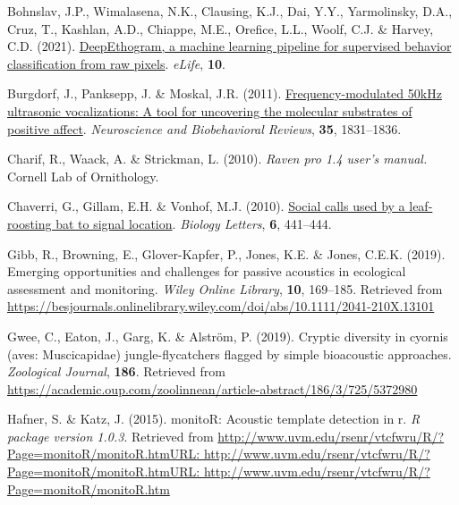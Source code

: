 \documentclass[
]{article}
\newlength{\cslhangindent}
\newlength{\cslentryspacingunit} %
\newenvironment{CSLReferences}[2] %
 {%
  \setlength{\parindent}{0pt}
  \ifodd #1
  \let\oldpar\par
  \def\par{\hangindent=\cslhangindent\oldpar}
  \fi
  \setlength{\parskip}{#2\cslentryspacingunit}
 }%
 {}
\begin{document}
\begin{CSLReferences}{1}{0}
\leavevmode{}%
Bohnslav, J.P., Wimalasena, N.K., Clausing, K.J., Dai, Y.Y.,
Yarmolinsky, D.A., Cruz, T., Kashlan, A.D., Chiappe, M.E., Orefice,
L.L., Woolf, C.J. \& Harvey, C.D. (2021).
\href{https://doi.org/10.7554/ELIFE.63377}{DeepEthogram, a machine
learning pipeline for supervised behavior classification from raw
pixels}. \emph{eLife}, \textbf{10}.

\leavevmode{}%
Burgdorf, J., Panksepp, J. \& Moskal, J.R. (2011).
\href{https://doi.org/10.1016/j.neubiorev.2010.11.011}{Frequency-modulated
50kHz ultrasonic vocalizations: A tool for uncovering the molecular
substrates of positive affect}. \emph{Neuroscience and Biobehavioral
Reviews}, \textbf{35}, 1831--1836.

\leavevmode{}%
Charif, R., Waack, A. \& Strickman, L. (2010). \emph{Raven pro 1.4
user's manual.} Cornell Lab of Ornithology.

\leavevmode{}%
Chaverri, G., Gillam, E.H. \& Vonhof, M.J. (2010).
\href{https://doi.org/10.1098/rsbl.2009.0964}{Social calls used by a
leaf-roosting bat to signal location}. \emph{Biology Letters},
\textbf{6}, 441--444.

\leavevmode{}%
Gibb, R., Browning, E., Glover-Kapfer, P., Jones, K.E. \& Jones, C.E.K.
(2019). Emerging opportunities and challenges for passive acoustics in
ecological assessment and monitoring. \emph{Wiley Online Library},
\textbf{10}, 169--185. Retrieved from
\url{https://besjournals.onlinelibrary.wiley.com/doi/abs/10.1111/2041-210X.13101}

\leavevmode{}%
Gwee, C., Eaton, J., Garg, K. \& Alström, P. (2019). Cryptic diversity
in cyornis (aves: Muscicapidae) jungle-flycatchers flagged by simple
bioacoustic approaches. \emph{Zoological Journal}, \textbf{186}.
Retrieved from
\url{https://academic.oup.com/zoolinnean/article-abstract/186/3/725/5372980}

\leavevmode{}%
Hafner, S. \& Katz, J. (2015). monitoR: Acoustic template detection in
r. \emph{R package version 1.0.3}. Retrieved from
\href{http://www.uvm.edu/rsenr/vtcfwru/R/?Page=monitoR/monitoR.htmURL:\%20http://www.uvm.edu/rsenr/vtcfwru/R/?Page=monitoR/monitoR.htmURL:\%20http://www.uvm.edu/rsenr/vtcfwru/R/?Page=monitoR/monitoR.htm}{http://www.uvm.edu/rsenr/vtcfwru/R/?Page=monitoR/monitoR.htmURL:
http://www.uvm.edu/rsenr/vtcfwru/R/?Page=monitoR/monitoR.htmURL:
http://www.uvm.edu/rsenr/vtcfwru/R/?Page=monitoR/monitoR.htm}


\end{CSLReferences}
\end{document}
